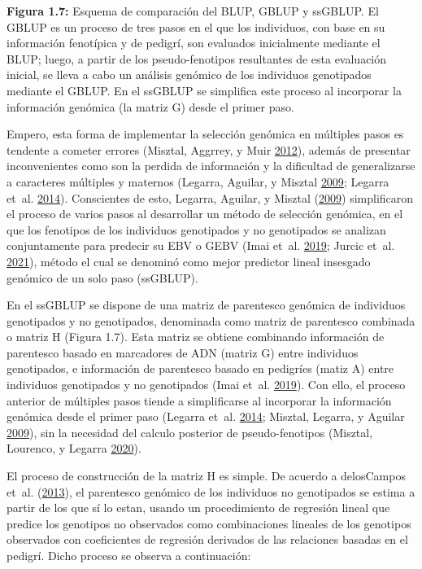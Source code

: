 \documentclass[11pt,spanish,a4paper,oneside,]{book} %
\begin{document}
\begin{center}
\textbf{Figura 1.7:} Esquema de comparación del BLUP, GBLUP y ssGBLUP. El GBLUP es un proceso de tres pasos en el que los individuos, con base en su información fenotípica y de pedigrí, son evaluados inicialmente mediante el BLUP; luego, a partir de los pseudo-fenotipos resultantes de esta evaluación inicial, se lleva a cabo un análisis genómico de los individuos genotipados mediante el GBLUP. En el ssGBLUP se simplifica este proceso al incorporar la información genómica (la matriz G) desde el primer paso.

\end{center}

Empero, esta forma de implementar la selección genómica en múltiples pasos es tendente a cometer errores (Misztal, Aggrrey, y Muir \protect\hyperlink{ref-cite:14}{2012}), además de presentar inconvenientes como son la perdida de información y la dificultad de generalizarse a caracteres múltiples y maternos (Legarra, Aguilar, y Misztal \protect\hyperlink{ref-cite:17}{2009}; Legarra et~al. \protect\hyperlink{ref-cite:15}{2014}). Conscientes de esto, Legarra, Aguilar, y Misztal (\protect\hyperlink{ref-cite:17}{2009}) simplificaron el proceso de varios pasos al desarrollar un método de selección genómica, en el que los fenotipos de los individuos genotipados y no genotipados se analizan conjuntamente para predecir su EBV o GEBV (Imai et~al. \protect\hyperlink{ref-cite:20}{2019}; Jurcic et~al. \protect\hyperlink{ref-cite:11}{2021}), método el cual se denominó como mejor predictor lineal insesgado genómico de un solo paso (ssGBLUP).

En el ssGBLUP se dispone de una matriz de parentesco genómica de individuos genotipados y no genotipados, denominada como matriz de parentesco combinada o matriz H (Figura 1.7). Esta matriz se obtiene combinando información de parentesco basado en marcadores de ADN (matriz G) entre individuos genotipados, e información de parentesco basado en pedigríes (matiz A) entre individuos genotipados y no genotipados (Imai et~al. \protect\hyperlink{ref-cite:20}{2019}). Con ello, el proceso anterior de múltiples pasos tiende a simplificarse al incorporar la información genómica desde el primer paso (Legarra et~al. \protect\hyperlink{ref-cite:15}{2014}; Misztal, Legarra, y Aguilar \protect\hyperlink{ref-cite:16}{2009}), sin la necesidad del calculo posterior de pseudo-fenotipos (Misztal, Lourenco, y Legarra \protect\hyperlink{ref-cite:18}{2020}).

El proceso de construcción de la matriz H es simple. De acuerdo a delosCampos et~al. (\protect\hyperlink{ref-cite:31}{2013}), el parentesco genómico de los individuos no genotipados se estima a partir de los que sí lo estan, usando un procedimiento de regresión lineal que predice los genotipos no observados como combinaciones lineales de los genotipos observados con coeficientes de regresión derivados de las relaciones basadas en el pedigrí. Dicho proceso se observa a continuación:
\end{document}
